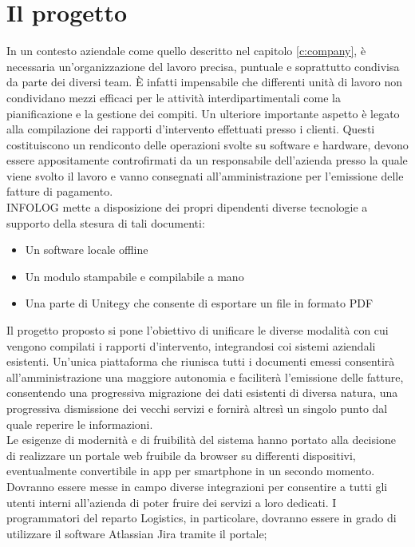 \chapter{Il progetto}\label{c:project}

In un contesto aziendale come quello descritto nel capitolo \ref{c:company}, è necessaria un'organizzazione del lavoro precisa, puntuale e soprattutto condivisa da parte dei diversi team.
È infatti impensabile che differenti unità di lavoro non condividano mezzi efficaci per le attività interdipartimentali come la pianificazione e la gestione dei compiti.
Un ulteriore importante aspetto è legato alla compilazione dei rapporti d'intervento effettuati presso i clienti.
Questi costituiscono un rendiconto delle operazioni svolte su software e hardware, devono essere appositamente controfirmati da un responsabile dell'azienda presso la quale viene svolto il lavoro
e vanno consegnati all'amministrazione per l'emissione delle fatture di pagamento.
\\
INFOLOG mette a disposizione dei propri dipendenti diverse tecnologie a supporto della stesura di tali documenti:
\begin{itemize}
    \item Un software locale offline
    \item Un modulo stampabile e compilabile a mano
    \item Una parte di Unitegy che consente di esportare un file in formato PDF
\end{itemize}
Il progetto proposto si pone l'obiettivo di unificare le diverse modalità con cui vengono compilati i rapporti d'intervento, integrandosi coi sistemi aziendali esistenti.
Un'unica piattaforma che riunisca tutti i documenti emessi consentirà all'amministrazione una maggiore autonomia e faciliterà l'emissione delle fatture, consentendo una progressiva
migrazione dei dati esistenti di diversa natura, una progressiva dismissione dei vecchi servizi e fornirà altresì un singolo punto dal quale reperire le informazioni.
\\
Le esigenze di modernità e di fruibilità del sistema hanno portato alla decisione di realizzare un portale web fruibile da browser su differenti dispositivi, eventualmente
convertibile in app per smartphone in un secondo momento.
Dovranno essere messe in campo diverse integrazioni per consentire a tutti gli utenti interni all'azienda di poter fruire dei servizi a loro dedicati.
I programmatori del reparto Logistics, in particolare, dovranno essere in grado di utilizzare il software Atlassian Jira tramite il portale;
